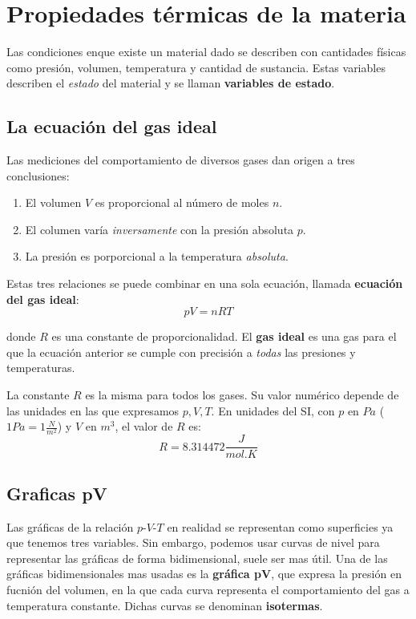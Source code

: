 \documentclass[12pt]{article}
\begin{document}
  \section{Propiedades térmicas de la materia}
  Las condiciones enque existe un material dado se describen con cantidades físicas como presión, volumen, temperatura y cantidad de sustancia. Estas variables describen el \textit{estado} del material y se llaman \textbf{variables de estado}.

  \subsection{La ecuación del gas ideal}
  Las mediciones del comportamiento de diversos gases dan origen a tres conclusiones:
  \begin{enumerate}[1.]
    \item El volumen $ V $ es proporcional al número de moles $ n $.

    \item El columen varía \textit{inversamente} con la presión absoluta $ p $.

    \item La presión es porporcional a la temperatura \textit{absoluta}.
  \end{enumerate}

  Estas tres relaciones se puede combinar en una sola ecuación, llamada \textbf{ecuación del gas ideal}:
  \[
  pV = nRT
  \]

  donde $ R $ es una constante de proporcionalidad. El \textbf{gas ideal} es una gas para el que la ecuación anterior se cumple con precisión a \textit{todas} las presiones y temperaturas. 

  La constante $ R $ es la misma para todos los gases. Su valor numérico depende de las unidades en las que expresamos $ p, V, T $. En unidades del SI, con $ p $ en $ Pa $ ($ 1Pa = 1\frac{N}{m^{2}} $) y $ V $ en $ m^{3} $, el valor de $ R $ es:
  \[
  R = 8.314472\frac{J}{mol.K}
  \]

  \subsection{Graficas pV}
  Las gráficas de la relación $ p $-$ V $-$ T $ en realidad se representan como superficies ya que tenemos tres variables. Sin embargo, podemos usar curvas de nivel para representar las gráficas de forma bidimensional, suele ser mas útil. Una de las gráficas bidimensionales mas usadas es la \textbf{gráfica pV}, que expresa la presión en fucnión del volumen, en la que cada curva representa el comportamiento del gas a temperatura constante. Dichas curvas se denominan \textbf{isotermas}.
\end{document}
